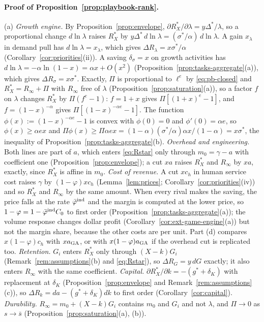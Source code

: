 \paragraph{Proof of Proposition~\ref{prop:playbook-rank}.}
(a) \emph{Growth engine.} By Proposition~\ref{prop:envelope}, $\partial R^*_X/\partial\lambda=y\Delta^*/\lambda$, so a proportional change $d\ln\lambda$ raises $R^*_X$ by $y\Delta^*\,d\ln\lambda=(\sigma^*/\alpha)\,d\ln\lambda$. A gain $x_\lambda$ in demand pull has $d\ln\lambda=x_\lambda$, which gives $\Delta R_\lambda=x\sigma^*/\alpha$ (Corollary~\ref{cor:priorities}(ii)). A saving $\delta_\sigma=x$ on growth activities has $d\ln\lambda=-\alpha\ln(1-x)=\alpha x+O(x^2)$ (Proposition~\ref{prop:tasks-aggregate}(a)), which gives $\Delta R_\sigma=x\sigma^*$. Exactly, $\Pi$ is proportional to $\ell^{e}$ by \eqref{eq:pb-closed} and $R^*_X=R_\infty+\Pi$ with $R_\infty$ free of $\lambda$ (Proposition~\ref{prop:saturation}(a)), so a factor $f$ on $\lambda$ changes $R^*_X$ by $\Pi(f^{e}-1)$: $f=1+x$ gives $\Pi[(1+x)^{e}-1]$, and $f=(1-x)^{-\alpha}$ gives $\Pi[(1-x)^{-\alpha e}-1]$. The function $\phi(x):=(1-x)^{-\alpha e}-1$ is convex with $\phi(0)=0$ and $\phi'(0)=\alpha e$, so $\phi(x)\ge\alpha e x$ and $\Pi\phi(x)\ge\Pi\alpha e x=(1-\alpha)(\sigma^*/\alpha)\alpha x/(1-\alpha)=x\sigma^*$, the inequality of Proposition~\ref{prop:tasks-aggregate}(b).
\emph{Overhead and engineering.} Both lines are part of $a$, which enters \eqref{eq:Rstar} only through $m_0=\gamma-a$ with coefficient one (Proposition~\ref{prop:envelope}); a cut $xa$ raises $R^*_X$ and $R_\infty$ by $xa$, exactly, since $R^*_X$ is affine in $m_0$.
\emph{Cost of revenue.} A cut $xc_h$ in human service cost raises $\gamma$ by $(1-\varphi)xc_h$ (Lemma~\ref{lem:prices}; Corollary~\ref{cor:priorities}(iv)) and so $R^*_X$ and $R_\infty$ by the same amount. When every rival makes the saving, the price falls at the rate $\bar\varphi^{\rm ind}$ and the margin is computed at the lower price, so $1-\varphi=1-\bar\varphi^{\rm ind}C_0$ to first order (Proposition~\ref{prop:tasks-aggregate}(a)); the volume response changes dollar profit (Corollary~\ref{cor:ext-game-engine}(a)) but not the margin share, because the other costs are per unit. Part (d) compares $x(1-\varphi)c_h$ with $xa_{\rm GA}$, or with $x(1-\varphi)a_{\rm GA}$ if the overhead cut is replicated too.
\emph{Retention.} $G_i$ enters $R^*_X$ only through $(X-k)G_i$ (Remark~\ref{rem:assumptions}(b) and \eqref{eq:Rstar}), so $\Delta R_G=y\,dG$ exactly; it also enters $R_\infty$ with the same coefficient.
\emph{Capital.} $\partial R^*_X/\partial k=-(g^*+\delta_K)$ with replacement at $\delta_K$ (Proposition~\ref{prop:envelope} and Remark~\ref{rem:assumptions}(c)), so $\Delta R_k=da-(g^*+\delta_K)dk$ to first order (Corollary~\ref{cor:capital}).
\emph{Durability.} $R_\infty=m_0+(X-k)G_i$ contains $m_0$ and $G_i$ and not $\lambda$, and $\Pi\to0$ as $s\to\bar s$ (Proposition~\ref{prop:saturation}(a), (b)).

